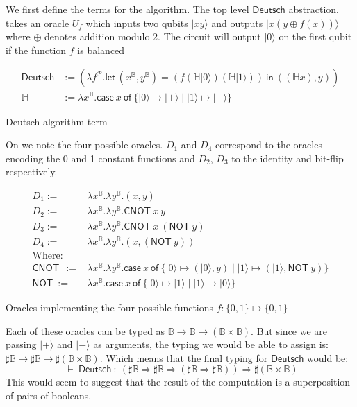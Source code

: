 \documentclass[runningheads,orivec,envcountsame,envcountsect]{llncs}
\newcommand\ket[1]{\ensuremath{|#1\rangle}}
\newcommand\AbsBasis{\ensuremath{\mathcal{P}}}
\def\Pair#1#2{(#1,#2)} %
\def\Lam#1#2#3{\lambda#1^{#2}{.}#3} %
\def\letkeyword{\mathsf{let}}
\def\inkeyword{\mathsf{in}}
\def\LetP#1#2#3#4#5#6{\letkeyword\,\Pair{#1^{#2}}{#3^{#4}}=#5~\inkeyword~#6}
\def\case#1#2#3#4#5{\ensuremath{\mathsf{case}~#1~\mathsf{of}~\{#2\mapsto #4 \mid #3\mapsto #5\}}}
\def\Arr{\Rightarrow}
\def\TYP#1#2#3{#1~{\vdash}~#2~{:}~#3}
\newcommand\B{\mathbb B}
\newcommand\Hd{\mathbb{H}}
\newcommand{\cnot}[2]{\mathsf{CNOT}\ #1\ #2}
\newcommand{\pauliX}[1]{\mathsf{NOT}\ #1}
\begin{document}
We first define the terms for the algorithm. The top level $\mathsf{Deutsch}$ abstraction, takes an oracle $U_f$  which inputs two qubits $\ket{x y}$ and outputs $\ket{x (y\oplus f(x))}$ where $\oplus$ denotes addition modulo 2. The circuit will output $\ket{0}$ on the first qubit if the function $f$ is balanced 
\begin{table}
    \small
    \begin{align*}
        \mathsf{Deutsch} &:= 
        (\Lam{{f}}{\AbsBasis}{
                \LetP{x}{\B}{y}{\B}
                {(f (\Hd \ket{0}) (\Hd \ket{1}))}
                {\Pair{(\Hd x)}{y}}
        })\\
        \Hd &:= \Lam{x}{\B}{\case{x}{\ket{0}}{\ket{1}}{\ket{+}}{\ket{-}}}
    \end{align*}
    \caption{Deutsch algorithm term}
\end{table}

On  we note the four possible oracles. $D_1$ and $D_4$ correspond to the oracles encoding the 0 and 1 constant functions and $D_2$, $D_3$ to the identity and bit-flip respectively.

\begin{table}
    \scriptsize
    \begin{align*}
        D_1 :=& \Lam{x}{\B}{\Lam{y}{\B}{\Pair{x}{y}}}\\
        D_2 :=& \Lam{x}{\B}{\Lam{y}{\B}{\cnot{x}{y}}}\\
        D_3 :=& \Lam{x}{\B}{\Lam{y}{\B}{\cnot{x}{(\pauliX{y})}}}\\
        D_4 :=& \Lam{x}{\B}{\Lam{y}{\B}{\Pair{x}{(\pauliX{y})}}}\\
        \text{Where:} &\\
        \cnot{}{} :=& \Lam{x}{\B}{\Lam{y}{\B}{
        \case{x}
        {\ket{0}}{\ket{1}}
        {\Pair{\ket{0}}{y}}{\Pair{\ket{1}}{\pauliX{y}}}}}\\
        \pauliX{} :=& \Lam{x}{\B}{\case{x}{\ket{0}}{\ket{1}}{\ket{1}}{\ket{0}}}
    \end{align*}
    
    \caption{Oracles implementing the four possible functions $f:\{0,1\}\mapsto\{0,1\}$}
    \label{tab:Oracles}
\end{table}

Each of these oracles can be typed as $\B\to\B\to(\B\times\B)$. But since we are passing $\ket{+}$ and $\ket{-}$ as arguments, the typing we would be able to assign is: $\sharp\B\to\sharp\B\to\sharp(\B\times\B)$. Which means that the final typing for $\mathsf{Deutsch}$ would be:
\[
\TYP{}{\mathsf{Deutsch}}{(\sharp\B\Arr\sharp\B\Arr(\sharp\B\Arr\sharp\B))\Arr\sharp(\B\times\B)}
\]
This would seem to suggest that the result of the computation is a superposition of pairs of booleans.
\end{document}
